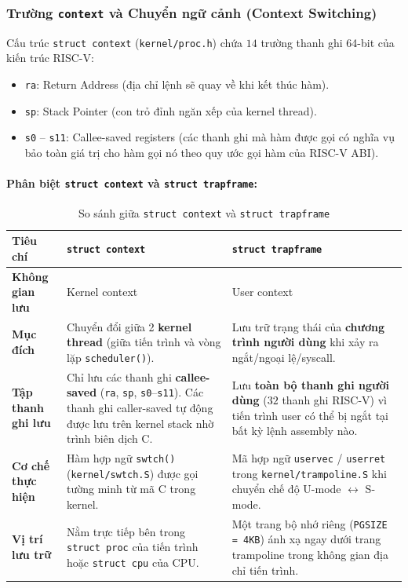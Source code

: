 \subsubsection{Trường \texttt{context} và Chuyển ngữ cảnh (Context Switching)}
Cấu trúc \texttt{struct context} (\texttt{kernel/proc.h}) chứa $14$ trường thanh ghi 64-bit của kiến trúc RISC-V:
\begin{itemize}
    \item \texttt{ra}: Return Address (địa chỉ lệnh sẽ quay về khi kết thúc hàm).
    \item \texttt{sp}: Stack Pointer (con trỏ đỉnh ngăn xếp của kernel thread).
    \item \texttt{s0} -- \texttt{s11}: Callee-saved registers (các thanh ghi mà hàm được gọi có nghĩa vụ bảo toàn giá trị cho hàm gọi nó theo quy ước gọi hàm của RISC-V ABI).
\end{itemize}

\paragraph{Phân biệt \texttt{struct context} và \texttt{struct trapframe}:}
\begin{table}[H]
\centering
\begin{tabularx}{\textwidth}{|l|X|X|}
\hline
\textbf{Tiêu chí} & \textbf{\texttt{struct context}} & \textbf{\texttt{struct trapframe}} \\ \hline
\textbf{Không gian lưu} & Kernel context & User context \\ \hline
\textbf{Mục đích} & Chuyển đổi giữa 2 \textbf{kernel thread} (giữa tiến trình và vòng lặp \texttt{scheduler()}). & Lưu trữ trạng thái của \textbf{chương trình người dùng} khi xảy ra ngắt/ngoại lệ/syscall. \\ \hline
\textbf{Tập thanh ghi lưu} & Chỉ lưu các thanh ghi \textbf{callee-saved} (\texttt{ra}, \texttt{sp}, \texttt{s0}--\texttt{s11}). Các thanh ghi caller-saved tự động được lưu trên kernel stack nhờ trình biên dịch C. & Lưu \textbf{toàn bộ thanh ghi người dùng} ($32$ thanh ghi RISC-V) vì tiến trình user có thể bị ngắt tại bất kỳ lệnh assembly nào. \\ \hline
\textbf{Cơ chế thực hiện} & Hàm hợp ngữ \texttt{swtch()} (\texttt{kernel/swtch.S}) được gọi tường minh từ mã C trong kernel. & Mã hợp ngữ \texttt{uservec} / \texttt{userret} trong \texttt{kernel/trampoline.S} khi chuyển chế độ U-mode $\leftrightarrow$ S-mode. \\ \hline
\textbf{Vị trí lưu trữ} & Nằm trực tiếp bên trong \texttt{struct proc} của tiến trình hoặc \texttt{struct cpu} của CPU. & Một trang bộ nhớ riêng (\texttt{PGSIZE = 4KB}) ánh xạ ngay dưới trang trampoline trong không gian địa chỉ tiến trình. \\ \hline
\end{tabularx}
\caption{So sánh giữa \texttt{struct context} và \texttt{struct trapframe}}
\end{table}
